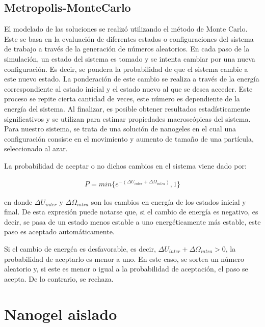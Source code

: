 	
	
	\subsection{Metropolis-MonteCarlo}
	
	El modelado de las soluciones se realiz\'o utilizando el m\'etodo de Monte Carlo. Este se basa en la evaluaci\'on de diferentes estados o configuraciones del sistema de trabajo a trav\'es de la generaci\'on de n\'umeros aleatorios.
	En cada paso de la simulaci\'on, un estado del sistema es tomado y se intenta cambiar por una nueva configuraci\'on. Es decir, se pondera la probabilidad de que el sistema cambie a este nuevo estado. La ponderaci\'on de este cambio se realiza a trav\'es de la energ\'ia correspondiente al estado inicial y el estado nuevo al que se desea acceder.
	Este proceso se repite cierta cantidad de veces, este n\'umero es dependiente de la energ\'ia del sistema. Al finalizar, es posible obtener resultados estad\'isticamente significativos y se utilizan para estimar propiedades macrosc\'opicas del sistema.
	Para nuestro sistema, se trata de una soluci\'on de nanogeles en el cual una configuraci\'on consiste en el movimiento y aumento de tama\~no de una part\'icula, seleccionado al azar.
	
	La probabilidad de aceptar o no dichos cambios en el sistema viene dado por:
	
	\begin{align}
		P = min \{e^{-(\Delta U_{inter} + \Delta \Omega_{intra})},1\}
	\end{align}
	
	\noindent en donde $\Delta U_{inter}$ y $\Delta\Omega_{intra}$ son los cambios en energ\'ia de los estados inicial y final. De esta expresi\'on puede notarse que, si el cambio de energ\'ia es negativo, es decir, se pasa de un estado menos estable a uno energ\'eticamente m\'as estable, este paso es aceptado autom\'aticamente.
	
	Si el cambio de energ\'ea es desfavorable, es decir, $\Delta U_{inter} + \Delta \Omega_{intra} > 0$, la probabilidad de aceptarlo es menor a uno. En este caso, se sortea un n\'umero aleatorio y, si este es menor o igual a la probabilidad de aceptaci\'on, el paso se acepta. De lo contrario, se rechaza. 
	
	
	\section{Nanogel aislado}
	
